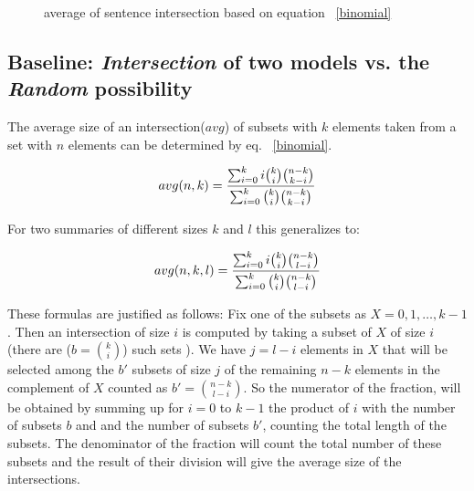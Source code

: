 \documentclass[a4paper]{report}
\begin{document}
\begin{figure}[ht]
	\caption{average of sentence intersection based on equation ~\ref{binomial}}
	\label{random}
\end{figure}

\subsection{Baseline: \emph{Intersection} of two models vs. the \emph{Random} possibility}
The average size of an intersection($avg$) of subsets with $k$ elements taken from a set with $n$ elements can be determined by eq. ~\ref{binomial}.
\begin{small}
\begin{equation}
\label{binomial}
avg(n,k) = {{\sum_{i=0}^k i \binom{k}{i}\binom{n-k}{k-i}}
\over {\sum_{i=0}^k  \binom{k}{i}\binom{n-k}{k-i}}}
\end{equation}
\end{small}
For two summaries of different sizes $k$ and $l$ this generalizes to:
\begin{small}
\begin{equation}
\label{binomialLK}
avg(n,k,l) = {{\sum_{i=0}^k i \binom{k}{i}\binom{n-k}{l-i}} \over
{\sum_{i=0}^k \binom{k}{i}\binom{n-k}{l-i}}}
\end{equation}
\end{small}
These formulas are justified as follows:
Fix one of the subsets as $X={0,1,\dots,k-1}$.
Then an intersection of size $i$ is computed by taking a subset of
$X$ of size $i$ (there are ($b=\binom{k}{i}$) such sets ). We have $j= l-i$
elements in $X$ that will be selected among the $b'$ subsets of size $j$
of the remaining $n-k$ elements in the complement of $X$ counted as
$b'=\binom{n-k}{l-i}$.
So the numerator of the fraction, will be obtained by summing up for $i=0$ to $k-1$
the product of $i$ with the number of subsets $b$ and 
and the number of subsets $b'$, counting the total length of the subsets. The denominator of the fraction 
will count the total number of these subsets and the result of their division will give the average size of the intersections. 
\end{document}
